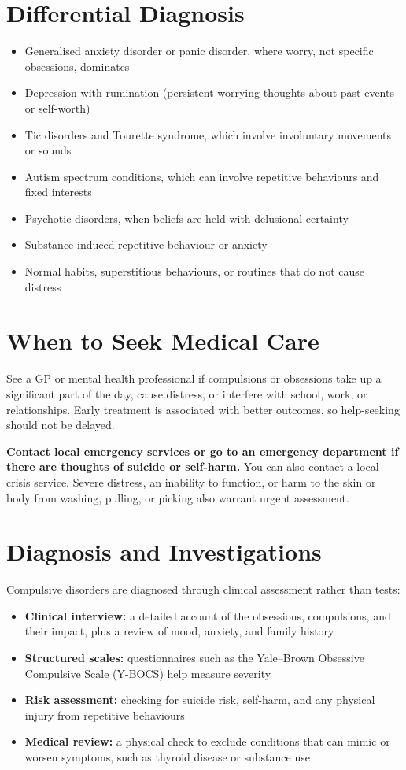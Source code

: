 \section*{Differential Diagnosis}
\begin{itemize}
    \item Generalised anxiety disorder or panic disorder, where worry, not specific obsessions, dominates
    \item Depression with rumination (persistent worrying thoughts about past events or self-worth)
    \item Tic disorders and Tourette syndrome, which involve involuntary movements or sounds
    \item Autism spectrum conditions, which can involve repetitive behaviours and fixed interests
    \item Psychotic disorders, when beliefs are held with delusional certainty
    \item Substance-induced repetitive behaviour or anxiety
    \item Normal habits, superstitious behaviours, or routines that do not cause distress
\end{itemize}

\section*{When to Seek Medical Care}
See a GP or mental health professional if compulsions or obsessions take up a significant part of the day, cause distress, or interfere with school, work, or relationships. Early treatment is associated with better outcomes, so help-seeking should not be delayed.

\textbf{Contact local emergency services or go to an emergency department if there are thoughts of suicide or self-harm.} You can also contact a local crisis service. Severe distress, an inability to function, or harm to the skin or body from washing, pulling, or picking also warrant urgent assessment.

\section*{Diagnosis and Investigations}
Compulsive disorders are diagnosed through clinical assessment rather than tests:

\begin{itemize}
    \item \textbf{Clinical interview:} a detailed account of the obsessions, compulsions, and their impact, plus a review of mood, anxiety, and family history
    \item \textbf{Structured scales:} questionnaires such as the Yale--Brown Obsessive Compulsive Scale (Y-BOCS) help measure severity
    \item \textbf{Risk assessment:} checking for suicide risk, self-harm, and any physical injury from repetitive behaviours
    \item \textbf{Medical review:} a physical check to exclude conditions that can mimic or worsen symptoms, such as thyroid disease or substance use
\end{itemize}

